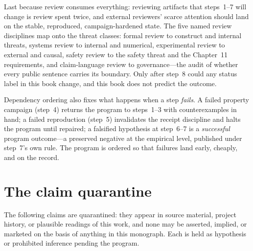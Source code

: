Last because review consumes everything: reviewing artifacts that steps~1--7 will change is review spent twice, and external reviewers' scarce attention should land on the stable, reproduced, campaign-hardened state. The five named review disciplines map onto the threat classes: formal review to construct and internal threats, systems review to internal and numerical, experimental review to external and causal, safety review to the safety threat and the Chapter~11 requirements, and claim-language review to governance---the audit of whether every public sentence carries its boundary. Only after step~8 could any status label in this book change, and this book does not predict the outcome.

\begin{remark}\label{ch12:rem-order}
Dependency ordering also fixes what happens when a step \emph{fails}. A failed property campaign (step~4) returns the program to steps~1--3 with counterexamples in hand; a failed reproduction (step~5) invalidates the receipt discipline and halts the program until repaired; a falsified hypothesis at step~6--7 is a \emph{successful} program outcome---a preserved negative at the empirical level, published under step~7's own rule. The program is ordered so that failures land early, cheaply, and on the record.
\end{remark}

\section{The claim quarantine}\label{ch12:quarantine}

The following claims are quarantined: they appear in source material, project history, or plausible readings of this work, and none may be asserted, implied, or marketed on the basis of anything in this monograph. Each is held as hypothesis or prohibited inference pending the program.

